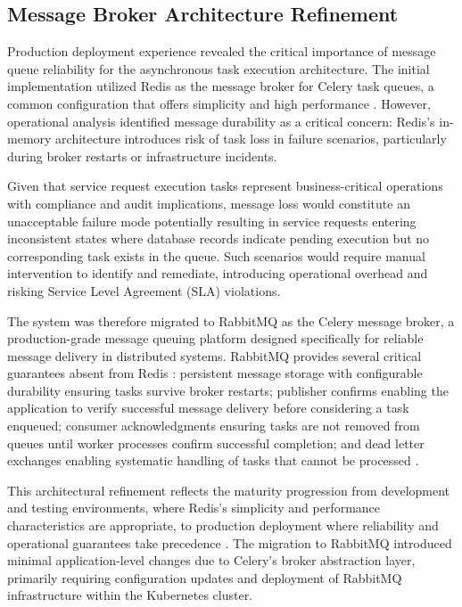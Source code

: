\subsection{Message Broker Architecture Refinement}

Production deployment experience revealed the critical importance of message queue reliability for the asynchronous task execution architecture. The initial implementation utilized Redis as the message broker for Celery task queues, a common configuration that offers simplicity and high performance \cite{redis_kafka_rabbitmq_comparison}. However, operational analysis identified message durability as a critical concern: Redis's in-memory architecture introduces risk of task loss in failure scenarios, particularly during broker restarts or infrastructure incidents.

Given that service request execution tasks represent business-critical operations with compliance and audit implications, message loss would constitute an unacceptable failure mode potentially resulting in service requests entering inconsistent states where database records indicate pending execution but no corresponding task exists in the queue. Such scenarios would require manual intervention to identify and remediate, introducing operational overhead and risking Service Level Agreement (SLA) violations.

The system was therefore migrated to RabbitMQ as the Celery message broker, a production-grade message queuing platform designed specifically for reliable message delivery in distributed systems. RabbitMQ provides several critical guarantees absent from Redis \cite{telecom4020018} \cite{redis_kafka_rabbitmq_comparison}: persistent message storage with configurable durability ensuring tasks survive broker restarts; publisher confirms enabling the application to verify successful message delivery before considering a task enqueued; consumer acknowledgments ensuring tasks are not removed from queues until worker processes confirm successful completion; and dead letter exchanges enabling systematic handling of tasks that cannot be processed \cite{telecom4020018}.

This architectural refinement reflects the maturity progression from development and testing environments, where Redis's simplicity and performance characteristics are appropriate, to production deployment where reliability and operational guarantees take precedence \cite{telecom4020018} \cite{redis_kafka_rabbitmq_comparison}. The migration to RabbitMQ introduced minimal application-level changes due to Celery's broker abstraction layer, primarily requiring configuration updates and deployment of RabbitMQ infrastructure within the Kubernetes cluster.

